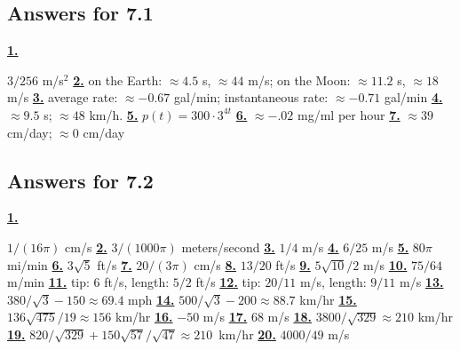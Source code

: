 \subsection *{Answers for 7.1}
\hypertarget {a:7.1.1}{\hyperlink {e:7.1.1}{\bfseries 1.}} \mdseries $3/256$ m/s$^2$\qquad 
\hypertarget {a:7.1.2}{\hyperlink {e:7.1.2}{\bfseries 2.}} \mdseries on the Earth: $\approx 4.5$ s, $\approx 44$ m/s; on the Moon: $\approx 11.2$ s, $\approx 18$ m/s\qquad 
\hypertarget {a:7.1.3}{\hyperlink {e:7.1.3}{\bfseries 3.}} \mdseries average rate: $\approx -0.67$ gal/min; instantaneous rate: $\approx -0.71$ gal/min\qquad 
\hypertarget {a:7.1.4}{\hyperlink {e:7.1.4}{\bfseries 4.}} \mdseries $\approx 9.5$ s; $\approx 48$ km/h.\qquad 
\hypertarget {a:7.1.5}{\hyperlink {e:7.1.5}{\bfseries 5.}} \mdseries $p(t) = 300\cdot 3^{4t}$\qquad 
\hypertarget {a:7.1.6}{\hyperlink {e:7.1.6}{\bfseries 6.}} \mdseries $\approx -.02$ mg/ml per hour\qquad 
\hypertarget {a:7.1.7}{\hyperlink {e:7.1.7}{\bfseries 7.}} \mdseries $\approx 39$ cm/day; $\approx 0$ cm/day\qquad 
\subsection *{Answers for 7.2}
\hypertarget {a:7.2.1}{\hyperlink {e:7.2.1}{\bfseries 1.}} \mdseries $1/(16\pi )$ cm/s\qquad 
\hypertarget {a:7.2.2}{\hyperlink {e:7.2.2}{\bfseries 2.}} \mdseries $3/(1000\pi )$ meters/second\qquad 
\hypertarget {a:7.2.3}{\hyperlink {e:7.2.3}{\bfseries 3.}} \mdseries $1/4$ m/s\qquad 
\hypertarget {a:7.2.4}{\hyperlink {e:7.2.4}{\bfseries 4.}} \mdseries $6/25$ m/s\qquad 
\hypertarget {a:7.2.5}{\hyperlink {e:7.2.5}{\bfseries 5.}} \mdseries $80\pi $ mi/min\qquad 
\hypertarget {a:7.2.6}{\hyperlink {e:7.2.6}{\bfseries 6.}} \mdseries $3\sqrt 5$ ft/s\qquad 
\hypertarget {a:7.2.7}{\hyperlink {e:7.2.7}{\bfseries 7.}} \mdseries $20/(3\pi )$ cm/s\qquad 
\hypertarget {a:7.2.8}{\hyperlink {e:7.2.8}{\bfseries 8.}} \mdseries $13/20$ ft/s\qquad 
\hypertarget {a:7.2.9}{\hyperlink {e:7.2.9}{\bfseries 9.}} \mdseries $5\sqrt {10}/2$ m/s\qquad 
\hypertarget {a:7.2.10}{\hyperlink {e:7.2.10}{\bfseries 10.}} \mdseries $75/64$ m/min\qquad 
\hypertarget {a:7.2.11}{\hyperlink {e:7.2.11}{\bfseries 11.}} \mdseries tip: 6 ft/s, length: $5/2$ ft/s\qquad 
\hypertarget {a:7.2.12}{\hyperlink {e:7.2.12}{\bfseries 12.}} \mdseries tip: $20/11$ m/s, length: $9/11$ m/s\qquad 
\hypertarget {a:7.2.13}{\hyperlink {e:7.2.13}{\bfseries 13.}} \mdseries $380/\sqrt 3-150\approx 69.4$ mph\qquad 
\hypertarget {a:7.2.14}{\hyperlink {e:7.2.14}{\bfseries 14.}} \mdseries $500/\sqrt 3-200\approx 88.7$ km/hr\qquad 
\hypertarget {a:7.2.15}{\hyperlink {e:7.2.15}{\bfseries 15.}} \mdseries $136\sqrt {475}/19\approx 156$ km/hr\qquad 
\hypertarget {a:7.2.16}{\hyperlink {e:7.2.16}{\bfseries 16.}} \mdseries $-50$ m/s\qquad 
\hypertarget {a:7.2.17}{\hyperlink {e:7.2.17}{\bfseries 17.}} \mdseries $68$ m/s\qquad 
\hypertarget {a:7.2.18}{\hyperlink {e:7.2.18}{\bfseries 18.}} \mdseries $3800/\sqrt {329}\approx 210$ km/hr\qquad 
\hypertarget {a:7.2.19}{\hyperlink {e:7.2.19}{\bfseries 19.}} \mdseries \hbox {$820/\sqrt {329}+150\sqrt {57}/\sqrt {47}\approx 210$ km/hr}\qquad 
\hypertarget {a:7.2.20}{\hyperlink {e:7.2.20}{\bfseries 20.}} \mdseries $4000/49$ m/s\qquad 
